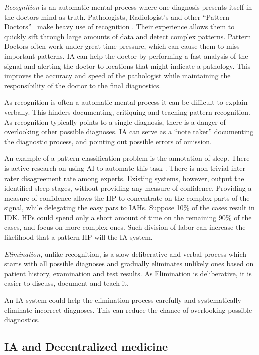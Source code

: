 \documentclass[11pt]{pnas-new}
\begin{document}
{\em Recognition} is an automatic mental process where one diagnosis
presents itself in the doctors mind as truth. Pathologists,
Radiologist's and other ``Pattern Doctors''~\cite{topol2019deep} make heavy use
of recognition . Their experience allows them to quickly sift through
large amounts of data and detect complex patterns. Pattern Doctors 
often work under great time pressure, which can cause them to miss
important patterns. IA can help the doctor by performing a fast
analysis of the signal and alerting the doctor to locations that might
indicate a pathology. This improves the accuracy and speed of the
pathologist while maintaining the responsibility of the doctor to the
final diagnostics. 

As recognition is often a automatic mental process it can be difficult to explain verbally.
This hinders documenting, critiquing and teaching pattern recognition. As
recognition typically points to a single diagnosis, there is a danger
of overlooking other possible diagnoses. IA can serve as a ``note
taker'' documenting the diagnostic process, and pointing out possible
errors of omission. 

An example of a pattern classification problem is the annotation of
sleep. There is active research on using AI to automate this task
\cite{sleepHT2020}.
There is non-trivial inter-rater disagreement rate among experts.  
Existing systems, however, output the identified sleep stages, 
without providing any measure of confidence. Providing a measure of confidence allows the HP to concentrate on the complex parts of the signal, while delegating the easy pars to IAHs. 
Suppose 10\% of the cases result in IDK. HPs could spend only a short amount of time on the remaining 90\% of the cases, and focus on more complex ones.
Such division of labor can increase the likelihood that a pattern HP will  the IA system.

{\em Elimination}, unlike recognition, is a slow deliberative and
verbal process which starts with all possible diagnoses and gradually
eliminates unlikely ones based on patient history, examination and
test results. As Elimination is deliberative, it is easier to discuss,
document and teach it.

An IA system could help the elimination process carefully and
systematically eliminate incorrect diagnoses. This can reduce the chance of overlooking possible diagnostics.

\subsection{IA and Decentralized medicine}
\end{document}
